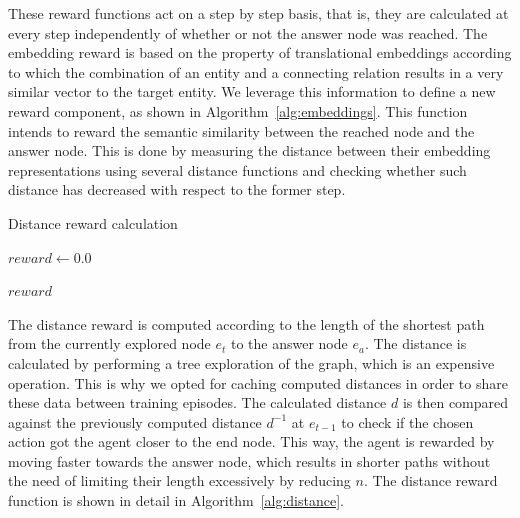 These reward functions act on a step by step basis, that is, they are calculated at every step independently of whether or not the answer node was reached. The embedding reward is based on the property of translational embeddings according to which the combination of an entity and a connecting relation results in a very similar vector to the target entity. We leverage this information to define a new reward component, as shown in Algorithm~\ref{alg:embeddings}. This function intends to reward the semantic similarity between the reached node and the answer node. This is done by measuring the distance between their embedding representations using several distance functions and checking whether such distance has decreased with respect to the former step.

\newcommand{\pluseq}{\mathrel{+}=}

\begin{algorithm}[!h]
\label{alg:distance}
\caption{Distance reward calculation}

$reward \gets 0.0$


\Return $reward$
\end{algorithm}


The distance reward is computed according to the length of the shortest path from the currently explored node $e_t$ to the answer node $e_a$. The distance is calculated by performing a tree exploration of the graph, which is an expensive operation. This is why we opted for caching computed distances in order to share these data between training episodes. The calculated distance $d$ is then compared against the previously computed distance $d^{-1}$ at $e_{t-1}$ to check if the chosen action got the agent closer to the end node. This way, the agent is rewarded by moving faster towards the answer node, which results in shorter paths without the need of limiting their length excessively by reducing $n$.
The distance reward function is shown in detail in Algorithm~\ref{alg:distance}.


